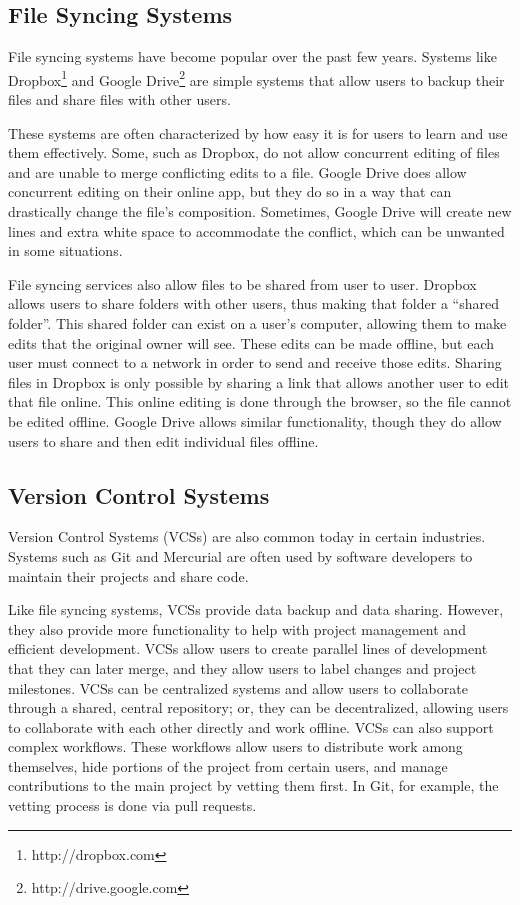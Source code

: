 \subsection{File Syncing Systems}

File syncing systems have become popular over the past few years. Systems like Dropbox\footnote{http://dropbox.com} and Google Drive\footnote{http://drive.google.com} are simple systems that allow users to backup their files and share files with other users. 

These systems are often characterized by how easy it is for users to learn and use them effectively. Some, such as Dropbox, do not allow concurrent editing of files and are unable to merge conflicting edits to a file. Google Drive does allow concurrent editing on their online app, but they do so in a way that can drastically change the file's composition. Sometimes, Google Drive will create new lines and extra white space to accommodate the conflict, which can be unwanted in some situations. 

File syncing services also allow files to be shared from user to user. Dropbox allows users to share folders with other users, thus making that folder a ``shared folder''. This shared folder can exist on a user's computer, allowing them to make edits that the original owner will see. These edits can be made offline, but each user must connect to a network in order to send and receive those edits. Sharing files in Dropbox is only possible by sharing a link that allows another user to edit that file online. This online editing is done through the browser, so the file cannot be edited offline. Google Drive allows similar functionality, though they do allow users to share and then edit individual files offline.

\subsection{Version Control Systems}

Version Control Systems (VCSs) are also common today in certain industries. Systems such as Git and Mercurial are often used by software developers to maintain their projects and share code.

Like file syncing systems, VCSs provide data backup and data sharing. However, they also provide more functionality to help with project management and efficient development. VCSs allow users to create parallel lines of development that they can later merge, and they allow users to label changes and project milestones. VCSs can be centralized systems and allow users to collaborate through a shared, central repository; or, they can be decentralized, allowing users to collaborate with each other directly and work offline. VCSs can also support complex workflows. These workflows allow users to distribute work among themselves, hide portions of the project from certain users, and manage contributions to the main project by vetting them first. In Git, for example, the vetting process is done via pull requests.

